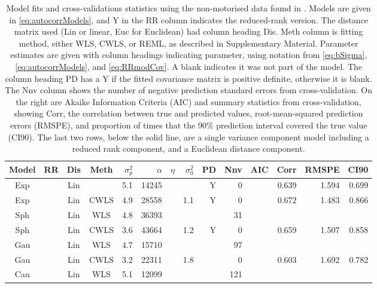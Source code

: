 \documentclass[11pt, titlepage]{article}\usepackage[]{graphicx}\usepackage[]{color}
\begin{document}
\begin{spacing}{1.9}
\begin{flushleft}
\newpage
\begin{table}[ht]
				\caption{Model fits and cross-validations statistics using the non-motorised data found in \citet{Ladl:Avga:Whea:Boyc:pred:2016}. Models are given in \ref{eq:autocorrModels}, and Y in the RR column indicates the reduced-rank version. The distance matrix used (Lin or linear, Euc for Euclidean) had column heading Dis. Meth column is fitting method, either WLS, CWLS, or REML, as described in Supplementary Material. Parameter estimates are given with column headings indicating parameter, using notation from \ref{eq:bSigma}, \ref{eq:autocorrModels}, and \ref{eq:RRmodCov}.  A blank indicates it was not part of the model.  The column heading PD has a Y if the fitted covariance matrix is positive definite, otherwise it is blank.  The Nnv column shows the number of negative prediction standard errors from cross-validation.  On the right are Akaike Information Criteria (AIC) and summary statistics from cross-validation, showing Corr, the correlation between true and predicted values, root-mean-squared prediction errors (RMSPE), and proportion of times that the 90\% prediction interval covered the true value (CI90).  The last two rows, below the solid line, are a single variance component model including a reduced rank component, and a Euclidean distance component.  \label{Tab:CVstats}}
\begin{center}
\begin{tabular}{cc|cc|rrrr|rr|rrrr}
  \hline
  \hline
  Model & RR & Dis & Meth & $\sigma^2_p$ & $\alpha$ & $\eta$ & $\sigma^2_0$ & PD & Nnv & AIC & Corr & RMSPE & CI90 \\
	\hline
  \hline
Exp &  & Lin &   & 5.1 & 14245 &  &  & Y & 0 &  & 0.639 & 1.594 & 0.699 \\ 
  Exp &  & Lin & CWLS & 4.9 & 28558 &  & 1.1 & Y & 0 &  & 0.672 & 1.483 & 0.866 \\ 
  Sph &  & Lin & WLS & 4.8 & 36393 &  &  &   & 31 &  &  &  &  \\ 
  Sph &  & Lin & CWLS & 3.6 & 43664 &  & 1.2 & Y & 0 &  & 0.659 & 1.507 & 0.858 \\ 
  Gau &  & Lin & WLS & 4.7 & 15710 &  &  &   & 97 &  &  &  &  \\ 
  Gau &  & Lin & CWLS & 3.2 & 22311 &  & 1.8 &   & 0 &  & 0.603 & 1.692 & 0.782 \\ 
  Cau &  & Lin & WLS & 5.1 & 12099 &  &  &   & 121 &  &  &  &  \\ 

\end{tabular}
\end{center}
\end{table}
\end{flushleft}
\end{spacing}
\end{document}
